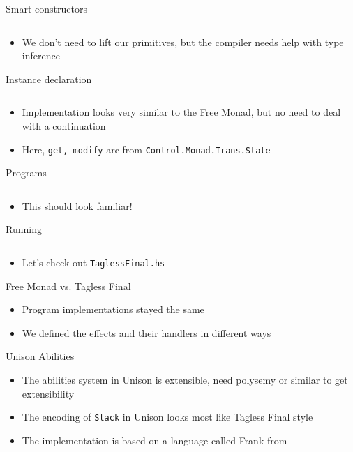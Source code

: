 \documentclass[hyperref={pdfpagelabels=false},12pt]{beamer}
\newcommand{\code}[2]{\texttt{#2}}
\newcommand{\haskell}[1]{\code{haskell}{#1}}
\newcommand{\bash}[1]{\code{bash}{#1}}
\newcommand{\unnamedUrl}[1]{\href{#1}{\color{blue}{#1}}}
\newcommand{\pygmentLines}[5]{\inputminted[bgcolor=lightgray,linenos,fontsize=#1,firstline=#2,lastline=#3,autogobble]{#4}{#5}}
\begin{document}
\begin{frame}{Smart constructors}
  \pygmentLines{\normalsize}{28}{35}{haskell}{code/TaglessFinal.hs}
  \begin{itemize}
    \item We don't need to lift our primitives, but the compiler needs help
      with type inference
  \end{itemize}
\end{frame}

\begin{frame}{Instance declaration}
  \pygmentLines{\normalsize}{21}{26}{haskell}{code/TaglessFinal.hs}
  \begin{itemize}
    \item Implementation looks very similar to the Free Monad, but no need to
      deal with a continuation
    \item Here, \haskell{get, modify} are from \haskell{Control.Monad.Trans.State}
  \end{itemize}
\end{frame}

\begin{frame}{Programs}
  \pygmentLines{\scriptsize}{37}{51}{haskell}{code/TaglessFinal.hs}
  \vspace{-0.5cm}
  \begin{itemize}
    \item This should look familiar!
  \end{itemize}
\end{frame}

\begin{frame}{Running}
  \pygmentLines{\scriptsize}{53}{57}{haskell}{code/TaglessFinal.hs}
  \begin{itemize}
    \item Let's check out \bash{TaglessFinal.hs}
  \end{itemize}
\end{frame}

\begin{frame}{Free Monad vs. Tagless Final}
  \begin{itemize}
    \item Program implementations stayed the same
    \item We defined the effects and their handlers in different ways
  \end{itemize}
\end{frame}

\begin{frame}{Unison Abilities}
  \begin{itemize}
    \item The abilities system in Unison is extensible, need polysemy or
      similar to get extensibility
    \item The encoding of \haskell{Stack} in Unison looks most like Tagless Final style
    \item The implementation is based on a language called Frank from
      \unnamedUrl{https://arxiv.org/pdf/1611.09259.pdf}
  \end{itemize}
\end{frame}
\end{document}
